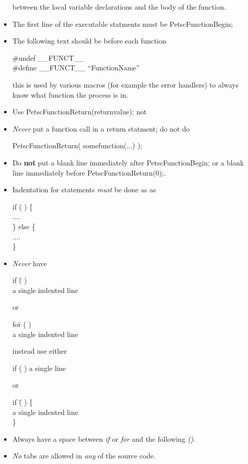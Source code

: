 \documentclass[twoside,12pt]{../sty/report_petsc}
\begin{document}
\begin{itemize}
      between the local variable declarations and the body of the function.
\item The first line of the executable statments must be PetscFunctionBegin;
\item The following text should be before each function
\begin{tabbing}
\#undef \_\_FUNCT\_\_\\
\#define \_\_FUNCT\_\_ ``FunctionName''
\end{tabbing}
this is used by various macros (for example the error handlers) to always know
what function the process is in.
\item Use PetscFunctionReturn(returnvalue); not 
\item {\em Never} put a function call in a return statment; do not do
\begin{tabbing}
   PetscFunctionReturn( somefunction(...) );
\end{tabbing}
\item Do {\bf not} put a blank line immediately after PetscFunctionBegin; or
a blank line immediately before PetscFunctionReturn(0);.
\item Indentation for  statements {\em must}  be done  as
as
\begin{tabbing}
   if (  ) \{\\
     ....\\
   \} else \{\\
     ....\\
   \}
\end{tabbing}
\item {\em Never}  have
\begin{tabbing}
   if \=(  ) \\
     \>a single indented line
\end{tabbing}
or
\begin{tabbing}
   fo\=r (  ) \\
     \>a single indented line
\end{tabbing}
instead use either
\begin{tabbing}
   if (  ) a single line
\end{tabbing}
or
\begin{tabbing}
   if \= (  ) \{\\
     \>a single indented line\\
   \}
\end{tabbing}
\item Always have a space between {\em if} or {\em for} and the following {\em ()}.
\item {\em No} tabs are allowed in {\em any} of the source code.

\end{itemize}
\end{document}
